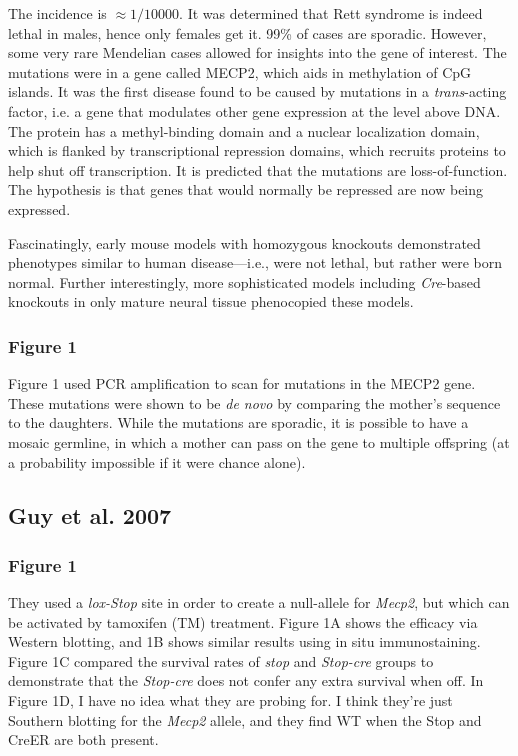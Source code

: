 The incidence is $\approx 1/10000$. It was determined that Rett syndrome is indeed lethal in males, hence only females get it. 99\% of cases are sporadic. However, some very rare Mendelian cases allowed for insights into the gene of interest. The mutations were in a gene called MECP2, which aids in methylation of CpG islands. It was the first disease found to be caused by mutations in a \textit{trans}-acting factor, i.e. a gene that modulates other gene expression at the level above DNA. The protein has a methyl-binding domain and a nuclear localization domain, which is flanked by transcriptional repression domains, which recruits proteins to help shut off transcription. It is predicted that the mutations are loss-of-function. The hypothesis is that genes that would normally be repressed are now being expressed.\newline

Fascinatingly, early mouse models with homozygous knockouts demonstrated phenotypes similar to human disease---i.e., were not lethal, but rather were born normal. Further interestingly, more sophisticated models including \textit{Cre}-based knockouts in only mature neural tissue phenocopied these models. 

\subsubsection*{Figure 1}

Figure 1 used PCR amplification to scan for mutations in the MECP2 gene. These mutations were shown to be \textit{de novo} by comparing the mother's sequence to the daughters. While the mutations are sporadic, it is possible to have a mosaic germline, in which a mother can pass on the gene to multiple offspring (at a probability impossible if it were chance alone). 



\subsection*{Guy et al. 2007}

\subsubsection*{Figure 1}

They used a \textit{lox-Stop} site in order to create a null-allele for \textit{Mecp2}, but which can be activated by tamoxifen (TM) treatment. Figure 1A shows the efficacy via Western blotting, and 1B shows similar results using in situ immunostaining. Figure 1C compared the survival rates of \textit{stop} and \textit{Stop-cre} groups to demonstrate that the \textit{Stop-cre} does not confer any extra survival when off. In Figure 1D, I have no idea what they are probing for. I think they're just Southern blotting for the \textit{Mecp2} allele, and they find WT when the Stop and CreER are both present. 

